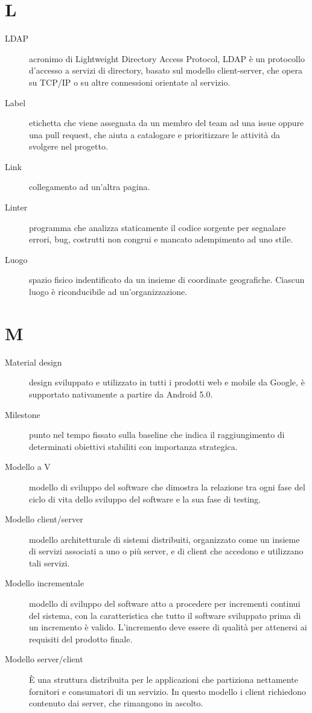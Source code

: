 \documentclass{article}
\begin{document}
\section{L}
\begin{description}
  \item[LDAP] acronimo di Lightweight Directory Access Protocol, LDAP è un protocollo d'accesso a servizi di directory, basato sul modello client-server, che opera su TCP/IP o su altre connessioni orientate al servizio.
  \item[Label] etichetta che viene assegnata da un membro del team ad una issue oppure una pull request, che aiuta a catalogare e prioritizzare le attività da svolgere nel progetto.
  \item[Link] collegamento ad un'altra pagina.
  \item[Linter] programma che analizza staticamente il codice sorgente per segnalare errori, bug, costrutti non congrui e mancato adempimento ad uno stile.
  \item[Luogo] spazio fisico indentificato da un insieme di coordinate geografiche. Ciascun luogo è riconducibile ad un'organizzazione.
\end{description}
\newpage
\section{M}
\begin{description}
  \item[Material design] design sviluppato e utilizzato in tutti i prodotti web e mobile da Google, è supportato nativamente a partire da Android 5.0.
  \item[Milestone] punto nel tempo fissato sulla baseline che indica il raggiungimento di determinati obiettivi stabiliti con importanza strategica.
  \item[Modello a V] modello di sviluppo del software che dimostra la relazione tra ogni fase del ciclo di vita dello sviluppo del software e la sua fase di testing.
  \item[Modello client/server] modello architetturale di sistemi distribuiti, organizzato come un insieme di servizi associati a uno o più server, e di client che accedono e utilizzano tali servizi.
  \item[Modello incrementale] modello di sviluppo del software atto a procedere per incrementi continui del sistema, con la caratteristica che tutto il software sviluppato prima di un incremento è valido. L'incremento deve essere di qualità per attenersi ai requisiti del prodotto finale.
  \item[Modello server/client] È una struttura distribuita per le applicazioni che partiziona nettamente fornitori e consumatori di un servizio. In questo modello i client richiedono contenuto dai server, che rimangono in ascolto.
\end{description}
\newpage
\end{document}
